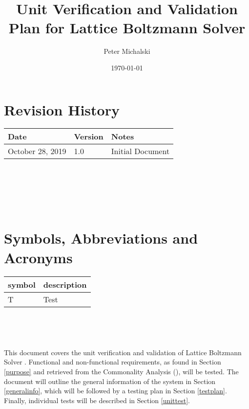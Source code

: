 \documentclass[12pt, titlepage]{article}
\newcommand{\myprogname}{Lattice Boltzmann Solver}
\begin{document}
\title{Unit Verification and Validation Plan for \myprogname} 
\author{Peter Michalski}
\date{\today}
	
\maketitle


\section{Revision History}

\begin{tabularx}{\textwidth}{p{4cm}p{2cm}X}
\toprule {\bf Date} & {\bf Version} & {\bf Notes}\\
\midrule
October 28, 2019 & 1.0 & Initial Document\\
\bottomrule
\end{tabularx}

~\newpage

\tableofcontents

~\newpage

\listoftables


\listoffigures


~\newpage

\section{Symbols, Abbreviations and Acronyms}

\renewcommand{\arraystretch}{1.2}
\begin{tabular}{l l} 
  \toprule		
  \textbf{symbol} & \textbf{description}\\
  \midrule 
  T & Test\\
  \bottomrule
\end{tabular}\\


~\newpage


\noindent This document covers the unit verification and validation of {\myprogname} . Functional and non-functional requirements, as found in Section \ref{purpose} and retrieved from the Commonality Analysis (\citet{LBM_CA_PM}), will be tested. The document will outline the general information of the system in Section \ref{generalinfo}, which will be followed by a testing plan in Section \ref{testplan}. Finally, individual tests will be described in Section \ref{unittest}. 
\end{document}
